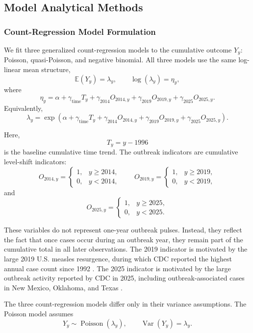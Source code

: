 \documentclass[utf8]{FrontiersinHarvard} %
\begin{document}
\subsection{Model Analytical Methods} 
\subsubsection{Count-Regression Model Formulation}\label{sec:methods}
We fit three generalized count-regression models to the cumulative outcome \(Y_y\): Poisson, quasi-Poisson, and negative binomial. All three models use the same log-linear mean structure,
\[
\mathbb{E}(Y_y)=\lambda_y,
\qquad
\log(\lambda_y)=\eta_y,
\]
where
\[
\eta_y
=
\alpha
+
\gamma_{\mathrm{time}}T_y
+
\gamma_{2014}O_{2014,y}
+
\gamma_{2019}O_{2019,y}
+
\gamma_{2025}O_{2025,y}.
\]
Equivalently,
\[
\lambda_y
=
\exp\left(
\alpha
+
\gamma_{\mathrm{time}}T_y
+
\gamma_{2014}O_{2014,y}
+
\gamma_{2019}O_{2019,y}
+
\gamma_{2025}O_{2025,y}
\right).
\]

Here,
\[
T_y=y-1996
\]
is the baseline cumulative time trend. The outbreak indicators are cumulative level-shift indicators:
\[
O_{2014,y}=
\begin{cases}
1, & y\geq 2014,\\
0, & y<2014,
\end{cases}
\qquad
O_{2019,y}=
\begin{cases}
1, & y\geq 2019,\\
0, & y<2019,
\end{cases}
\]
and
\[
O_{2025,y}=
\begin{cases}
1, & y\geq 2025,\\
0, & y<2025.
\end{cases}
\]

These variables do not represent one-year outbreak pulses. Instead, they reflect the fact that once cases occur during an outbreak year, they remain part of the cumulative total in all later observations. The 2019 indicator is motivated by the large 2019 U.S. measles resurgence, during which CDC reported the highest annual case count since 1992 \citep{patel2019measles}. The 2025 indicator is motivated by the large outbreak activity reported by CDC in 2025, including outbreak-associated cases in New Mexico, Oklahoma, and Texas \citep{mathis2025measles,cdc2026cases}.

The three count-regression models differ only in their variance assumptions. The Poisson model assumes
\[
Y_y \sim \operatorname{Poisson}(\lambda_y),
\qquad
\operatorname{Var}(Y_y)=\lambda_y.
\]
\end{document}
